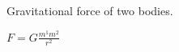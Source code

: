 \documentclass{article}
\begin{document}
Gravitational force of two bodies.

\(F = G \frac{m^1m^2}{r^2}\)
\end{document}
